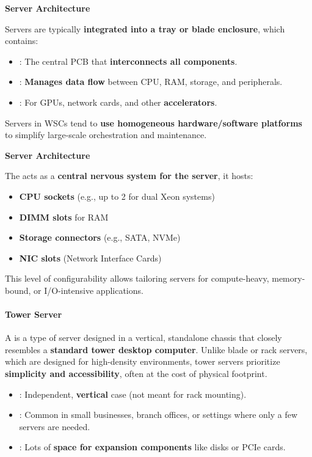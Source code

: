\newpage

\begin{flushleft}
    \textcolor{Green3}{ \textbf{Server Architecture}}
\end{flushleft}
Servers are typically \textbf{integrated into a tray or blade enclosure}, which contains:
\begin{itemize}
    \item {}: The central PCB that \textbf{interconnects all components}.
    \item {}: \textbf{Manages data flow} between CPU, RAM, storage, and peripherals.
    \item {}: For GPUs, network cards, and other \textbf{accelerators}.
\end{itemize}
Servers in WSCs tend to \textbf{use homogeneous hardware/software platforms} to simplify large-scale orchestration and maintenance.

\highspace
\begin{flushleft}
    \textcolor{Green3}{ \textbf{Server Architecture}}
\end{flushleft}
The  acts as a \textbf{central nervous system for the server}, it hosts:
\begin{itemize}
    \item \textbf{CPU sockets} (e.g., up to 2 for dual Xeon systems)
    \item \textbf{DIMM slots} for RAM
    \item \textbf{Storage connectors} (e.g., SATA, NVMe)
    \item \textbf{NIC slots} (Network Interface Cards)
\end{itemize}
This level of configurability allows tailoring servers for compute-heavy, memory-bound, or I/O-intensive applications.

\newpage

\paragraph{Tower Server}\label{paragraph: Tower Server}

A  is a type of server designed in a vertical, standalone chassis that closely resembles a \textbf{standard tower desktop computer}. Unlike blade or rack servers, which are designed for high-density environments, tower servers prioritize \textbf{simplicity and accessibility}, often at the cost of physical footprint.
\begin{itemize}
    \item {}: Independent, \textbf{vertical} case (not meant for rack mounting).
    \item {}: Common in small businesses, branch offices, or settings where only a few servers are needed.
    \item {}: Lots of \textbf{space for expansion components} like disks or PCIe cards.
\end{itemize}

